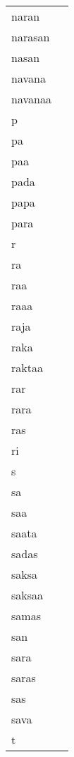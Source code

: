 \documentclass{article}
\begin{document}
\begin{longtable}{|l|p{}|}
naran & \textIndus{  } \\
narasan & \textIndus{} \\
nasan & \textIndus{      } \\
navana & \textIndus{} \\
navanaa & \textIndus{} \\
p & \textIndus{   } \\
pa & \textIndus{        } \\
paa & \textIndus{ } \\
pada & \textIndus{} \\
papa & \textIndus{} \\
para & \textIndus{} \\
r & \textIndus{                  } \\
ra & \textIndus{                                                                } \\
raa & \textIndus{ } \\
raaa & \textIndus{} \\
raja & \textIndus{} \\
raka & \textIndus{} \\
raktaa & \textIndus{} \\
rar & \textIndus{} \\
rara & \textIndus{ } \\
ras & \textIndus{  } \\
ri & \textIndus{   } \\
s & \textIndus{               } \\
sa & \textIndus{                                                } \\
saa & \textIndus{} \\
saata & \textIndus{} \\
sadas & \textIndus{ } \\
saksa & \textIndus{} \\
saksaa & \textIndus{ } \\
samas & \textIndus{ } \\
san & \textIndus{ } \\
sara & \textIndus{} \\
saras & \textIndus{ } \\
sas & \textIndus{ } \\
sava & \textIndus{} \\
t & \textIndus{           } \\

\end{longtable}
\end{document}

